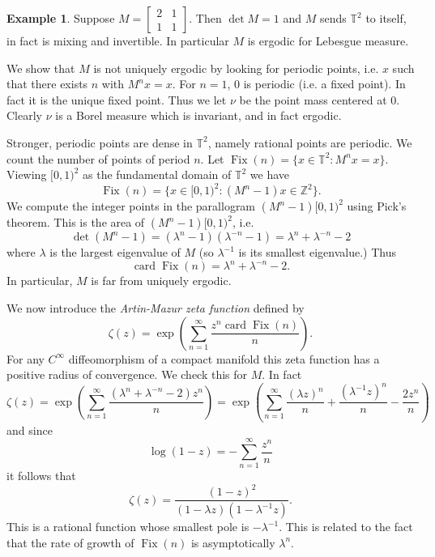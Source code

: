 \documentclass[12pt]{report}
\newcommand{\ZZ}{\mathbb{Z}}
\newcommand{\TT}{\mathbb{T}}
\newcommand{\card}{\operatorname{card}}
\DeclareMathOperator*{\Fix}{Fix}
\newcommand{\dfn}[1]{\emph{#1}\index{#1}}
\theoremstyle{definition}
\newtheorem{example}[theorem]{Example}
\begin{document}
\begin{example}
Suppose $M = \begin{bmatrix}2&1\\1&1\end{bmatrix}$. Then $\det M = 1$ and $M$ sends $\TT^2$ to itself, in fact is mixing and invertible. In particular $M$ is ergodic for Lebesgue measure.

We show that $M$ is not uniquely ergodic by looking for periodic points, i.e. $x$ such that there exists $n$ with $M^nx = x$. For $n = 1$, $0$ is periodic (i.e. a fixed point). In fact it is the unique fixed point.
Thus we let $\nu$ be the point mass centered at $0$. Clearly $\nu$ is a Borel measure which is invariant, and in fact ergodic.

Stronger, periodic points are dense in $\TT^2$, namely rational points are periodic. We count the number of points of period $n$. Let $\Fix(n) = \{x \in \TT^2: M^nx = x\}$. Viewing $[0, 1)^2$ as the fundamental domain of $\TT^2$ we have
$$\Fix(n) = \{x \in [0, 1)^2: (M^n - 1)x \in \ZZ^2\}.$$
We compute the integer points in the parallogram $(M^n - 1)[0, 1)^2$ using Pick's theorem. This is the area of $(M^n - 1)[0, 1)^2$, i.e.
$$\det (M^n - 1) = (\lambda^n - 1)(\lambda^{-n} - 1) = \lambda^n + \lambda^{-n} - 2$$
where $\lambda$ is the largest eigenvalue of $M$ (so $\lambda^{-1}$ is its smallest eigenvalue.) Thus
$$\card \Fix(n) = \lambda^n + \lambda^{-n} - 2.$$
In particular, $M$ is far from uniquely ergodic.

We now introduce the \dfn{Artin-Mazur zeta function} defined by
$$\zeta(z) = \exp\left(\sum_{n=1}^\infty \frac{z^n \card \Fix(n)}{n} \right).$$
For any $C^\infty$ diffeomorphism of a compact manifold this zeta function has a positive radius of convergence. We check this for $M$. In fact
$$\zeta(z) = \exp\left(\sum_{n=1}^\infty \frac{(\lambda^n + \lambda^{-n} - 2)z^n}{n}\right) = \exp\left(\sum_{n=1}^\infty \frac{(\lambda z)^n}{n} + \frac{(\lambda^{-1} z)^n}{n} - \frac{2z^n}{n}\right)$$
and since
$$\log (1-z) = -\sum_{n=1}^\infty \frac{z^n}{n}$$
it follows that
$$\zeta(z) = \frac{(1 - z)^2}{(1 - \lambda z)(1 - \lambda^{-1}z)}.$$
This is a rational function whose smallest pole is $-\lambda^{-1}$. This is related to the fact that the rate of growth of $\Fix(n)$ is asymptotically $\lambda^n$.
\end{example}
\end{document}
